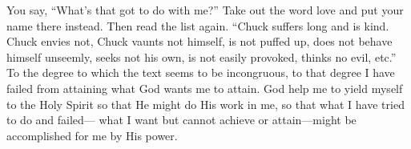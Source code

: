 You say, “What’s that got to do with me?” Take out the
word love and put your name there instead. Then read the
list again. “Chuck suffers long and is kind. Chuck envies
not, Chuck vaunts not himself, is not puffed up, does not
behave himself unseemly, seeks not his own, is not easily
provoked, thinks no evil, etc.” To the degree to which the
text seems to be incongruous, to that degree I have failed
from attaining what God wants me to attain. God help me
to yield myself to the Holy Spirit so that He might do His
work in me, so that what I have tried to do and failed—
what I want but cannot achieve or attain—might be accomplished
for me by His power.


